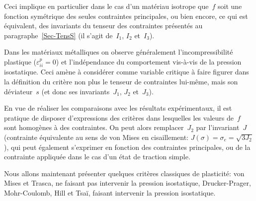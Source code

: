 Ceci implique en particulier dans le cas d'un matériau isotrope que~$f$ soit une fonction symétrique des
seules contraintes principales, ou bien encore, ce qui est équivalent, des invariants du tenseur des contraintes
présentés au paragraphe~\ref{Sec-TensS} (il s'agit de~$I_1$, $I_2$ et~$I_3$).

\medskip
Dans les matériaux métalliques on observe généralement l'incompressibilité plastique ($\varepsilon^p_{ii} = 0$)
et l'indépendance du comportement vis-à-vis de la pression isostatique. Ceci amène à considérer
comme variable critique à faire figurer dans la définition du critère non plus le tenseur de contraintes lui-même,
mais son déviateur~$s$ (et donc ses invariants~$J_1$, $J_2$ et~$J_3$).

En vue de réaliser les comparaisons avec les résultats expérimentaux, il est pratique de disposer d'expressions
des critères dans lesquelles les valeurs de~$f$ sont homogènes à des contraintes.
On peut alors remplacer~$J_2$ par l'invariant~$J$ (contrainte équivalente au sens de von Mises en cisaillement:
$J(\sigma)=\sigma_e= \sqrt{3J_2}$), qui peut également s'exprimer en fonction des contraintes principales,
ou de la contrainte appliquée dans le cas d'un état de traction simple.

\medskip
Nous allons maintenant présenter quelques critères classiques de plasticité: von Mises et Trasca, ne faisant
pas intervenir la pression isostatique, Drucker-Prager, Mohr-Coulomb, Hill et Tsaï, faisant intervenir
la pression isostatique.


